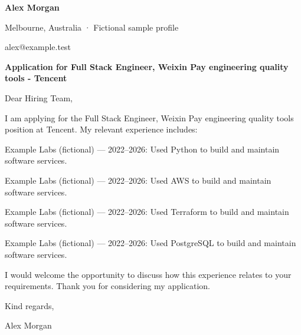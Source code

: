 \documentclass[10pt,a4paper]{article}
\begin{document}
{\LARGE\bfseries\color{navy} Alex Morgan}\par
Melbourne, Australia · Fictional sample profile\par
alex@example.test\par
{\large\bfseries\color{navy} Application for Full Stack Engineer, Weixin Pay engineering quality tools - Tencent}\par
Dear Hiring Team,\par
I am applying for the Full Stack Engineer, Weixin Pay engineering quality tools position at Tencent. My relevant experience includes:\par
Example Labs (fictional) — 2022–2026: Used Python to build and maintain software services.\par
Example Labs (fictional) — 2022–2026: Used AWS to build and maintain software services.\par
Example Labs (fictional) — 2022–2026: Used Terraform to build and maintain software services.\par
Example Labs (fictional) — 2022–2026: Used PostgreSQL to build and maintain software services.\par
I would welcome the opportunity to discuss how this experience relates to your requirements. Thank you for considering my application.\par
Kind regards,\par
Alex Morgan\par
\end{document}
